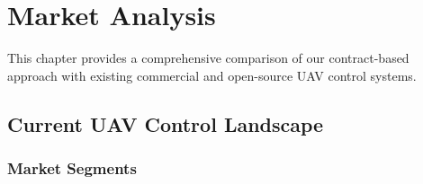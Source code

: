 
\chapter{Market Analysis}
\label{ch:market}

This chapter provides a comprehensive comparison of our contract-based approach with existing commercial and open-source UAV control systems.

\section{Current UAV Control Landscape}

\subsection{Market Segments}

